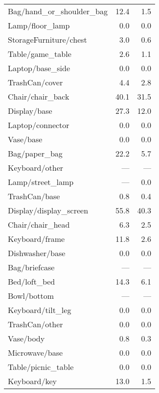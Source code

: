 \begin{table}[!htb]
\begin{tabular}{lrr}
Bag/hand\_or\_shoulder\_bag &                     12.4 &  1.5 \\
Lamp/floor\_lamp          &                      0.0 &  0.0 \\
StorageFurniture/chest   &                      3.0 &  0.6 \\
Table/game\_table         &                      2.6 &  1.1 \\
Laptop/base\_side         &                      0.0 &  0.0 \\
TrashCan/cover           &                      4.4 &  2.8 \\
Chair/chair\_back         &                     40.1 & 31.5 \\
Display/base             &                     27.3 & 12.0 \\
Laptop/connector         &                      0.0 &  0.0 \\
Vase/base                &                      0.0 &  0.0 \\
Bag/paper\_bag            &                     22.2 &  5.7 \\
Keyboard/other           &                      --- &  --- \\
Lamp/street\_lamp         &                      --- &  0.0 \\
TrashCan/base            &                      0.8 &  0.4 \\
Display/display\_screen   &                     55.8 & 40.3 \\
Chair/chair\_head         &                      6.3 &  2.5 \\
Keyboard/frame           &                     11.8 &  2.6 \\
Dishwasher/base          &                      0.0 &  0.0 \\
Bag/briefcase            &                      --- &  --- \\
Bed/loft\_bed             &                     14.3 &  6.1 \\
Bowl/bottom              &                      --- &  --- \\
Keyboard/tilt\_leg        &                      0.0 &  0.0 \\
TrashCan/other           &                      0.0 &  0.0 \\
Vase/body                &                      0.8 &  0.3 \\
Microwave/base           &                      0.0 &  0.0 \\
Table/picnic\_table       &                      0.0 &  0.0 \\
Keyboard/key             &                     13.0 &  1.5 \\
\bottomrule
\end{tabular}
\end{table}

